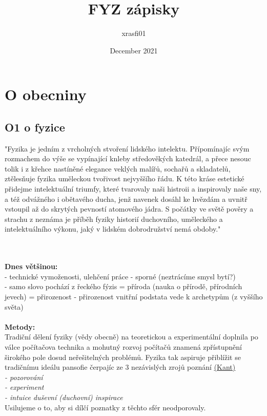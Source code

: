 \documentclass{article}
\title{FYZ zápisky}
\author{xrasfi01 }
\date{December 2021}
\begin{document}
\maketitle

\section*{O obecniny}
\subsection*{O1 o fyzice}
\begin{footnotesize}
"Fyzika je jedním z vrcholných stvoření lidského intelektu. Přípomínajíc svým rozmachem do výše se vypínající knleby středověkých katedrál, a přece nesouc tolik i z křehce nastíněné elegance veklých malířů, sochařů a skladatelů, ztělesňuje fyzika uměleckou tvořivost nejvyššího řádu. K této kráse estetické přidejme intelektuální triumfy, které tvarovaly naši histroii a inspirovaly naše sny, a též odvážného i obětavého ducha, jenž navenek dosáhl ke hvězdám a uvnitř vstoupil až do skrytých pevností atomového jádra. S počátky ve světě pověry a strachu z neznáma je příběh fyziky historií duchovního, uměleckého a intelektuálního výkonu, jaký v lidském dobrodružství nemá obdoby." 
\end{footnotesize}
\\
\\
\textbf{Dnes většinou:}
\\
- technické vymoženosti, ulehčení práce - sporné (neztrácíme smysl bytí?) \\
- samo slovo pochází z řeckého fýzis = příroda (nauka o přírodě, přírodních jevech) = přirozenost - přirozenost vnitřní podstata vede k archetypům (z vyššího světa)
\\ 
\\
\textbf{Metody:}
\\
Tradiční dělení fyziky (vědy obecně) na teoretickou a experimentální doplnila po válce počítačova technika a mohutný rozvoj počítačů znamená zpřístupnění širokého pole dosud neřešitelných problémů. Fyzika tak aspiruje přiblížit se tradičnímu ideálu pansofie čerpajíc ze 3 nezávislých zrojů poznání \href{(https://en.wikipedia.org/wiki/Immanuel_Kant)}{(Kant)}\\
\emph{- pozorování}\\
\emph{- experiment }\\
\emph{- intuice duševní (duchovní) inspirace}\\
Usilujeme o to, aby si dílčí poznatky z těchto sfér neodporovaly. \\
\end{document}
